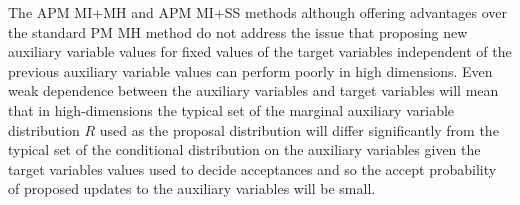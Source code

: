 The \ac{APM} \ac{MI}+\ac{MH} and \ac{APM} \ac{MI}+\ac{SS} methods although offering advantages over the standard \ac{PM} \ac{MH} method do not address the issue that proposing new auxiliary variable values for fixed values of the target variables independent of the previous auxiliary variable values can perform poorly in high dimensions. Even weak dependence between the auxiliary variables and target variables will mean that in high-dimensions the typical set of the  marginal auxiliary variable distribution $R$ used as the proposal distribution will differ significantly from the typical set of the conditional distribution on the auxiliary variables given the target variables values used to decide acceptances and so the accept probability of proposed updates to the auxiliary variables will be small. %


